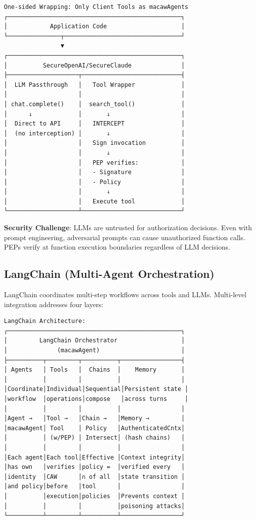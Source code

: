 {{\begin{verbatim}
One-sided Wrapping: Only Client Tools as macawAgents
┌─────────────────────────────────────────────────┐
│            Application Code                     │
└───────────────┬─────────────────────────────────┘
                ▼
┌─────────────────────────────────────────────────┐
│          SecureOpenAI/SecureClaude              │
├────────────────────┬────────────────────────────┤
│  LLM Passthrough   │   Tool Wrapper             │
│                    │                            │
│ chat.complete()    │  search_tool()             │
│      ↓             │       ↓                    │
│  Direct to API     │   INTERCEPT                │
│  (no interception) │       ↓                    │
│                    │   Sign invocation          │
│                    │       ↓                    │
│                    │   PEP verifies:            │
│                    │   - Signature              │
│                    │   - Policy                 │
│                    │       ↓                    │
│                    │   Execute tool             │
└────────────────────┴────────────────────────────┘
\end{verbatim}}

\textbf{Security Challenge}: LLMs are untrusted for authorization decisions. Even with prompt engineering, adversarial prompts can cause unauthorized function calls. PEPs verify at function execution boundaries regardless of LLM decisions.

\subsection*{LangChain (Multi-Agent Orchestration)}

LangChain coordinates multi-step workflows across tools and LLMs. Multi-level integration addresses four layers:

{\tiny
\begin{verbatim}
LangChain Architecture:
┌─────────────────────────────────────────────────┐
│         LangChain Orchestrator                  │
│              (macawAgent)                       │
├──────────┬─────────┬──────────┬─────────────────┤
│ Agents   │ Tools   │  Chains  │    Memory       │
│          │         │          │                 │
│Coordinate│Individual│Sequential│Persistent state │
│workflow  │operations│compose   │across turns     │
│          │         │          │                 │
│Agent →   │Tool →   │Chain →   │Memory →         │
│macawAgent│ Tool    │ Policy   │AuthenticatedCntx│
│          │ (w/PEP) │ Intersect│ (hash chains)   │
│          │         │          │                 │
│Each agent│Each tool│Effective │Context integrity│
│has own   │verifies │policy =  │verified every   │
│identity  │CAW      │∩ of all  │state transition │
│and policy│before   │tool      │                 │
│          │execution│policies  │Prevents context │
│          │         │          │poisoning attacks│
└──────────┴─────────┴──────────┴─────────────────┘


\end{verbatim}}}
